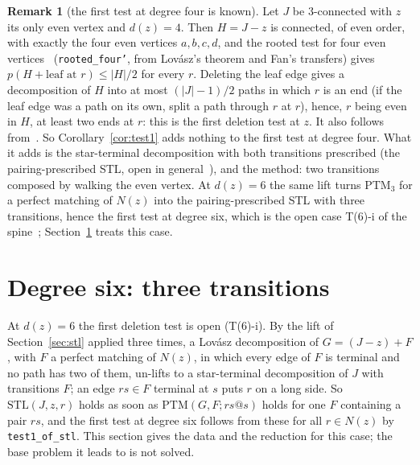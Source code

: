 \documentclass[11pt]{amsart}
\theoremstyle{definition}
\newtheorem{remark}[theorem]{Remark}
\newcommand{\PTM}{\mathrm{PTM}}
\newcommand{\STL}{\mathrm{STL}}
\begin{document}
\begin{remark}[the first test at degree four is known]\label{rem:known}
Let $J$ be $3$-connected with $z$ its only even vertex and $d(z)=4$. Then $H=J-z$ is connected,
of even order, with exactly the four even vertices $a,b,c,d$, and the rooted test for four even
vertices~\cite[Corollary~22]{ES} (\texttt{rooted\_four'}, from Lov\'asz's theorem and Fan's
transfers) gives $p(H+\text{leaf at }r)\le|H|/2$ for every $r$. Deleting the leaf edge gives a
decomposition of $H$ into at most $(|J|-1)/2$ paths in which $r$ is an end (if the leaf edge was a
path on its own, split a path through $r$ at $r$), hence, $r$ being even in $H$, at least two
ends at $r$: this is the first deletion test at $z$. It also follows from~\cite[Theorem~13]{BS}.
So Corollary~\ref{cor:test1} adds nothing to the first test at degree four. What it adds is the
star-terminal decomposition with both transitions prescribed (the pairing-prescribed STL,
open in general~\cite[Conjecture~7.4]{STL}), and the method: two transitions composed by
walking the even vertex. At $d(z)=6$ the same lift turns $\PTM_3$ for a perfect matching of
$N(z)$ into the pairing-prescribed STL with three transitions, hence the first test at degree
six, which is the open case T(6)-i of the spine~\cite{SP}; Section~\ref{sec:six} treats this case.
\end{remark}

\section{Degree six: three transitions}\label{sec:six}

At $d(z)=6$ the first deletion test is open (T(6)-i). By the lift of Section~\ref{sec:stl} applied
three times, a Lov\'asz decomposition of $G=(J-z)+F$, with $F$ a perfect matching of $N(z)$, in
which every edge of $F$ is terminal and no path has two of them, un-lifts to a star-terminal
decomposition of $J$ with transitions $F$; an edge $rs\in F$ terminal at $s$ puts $r$ on a long
side. So $\STL(J,z,r)$ holds as soon as $\PTM(G,F;rs@s)$ holds for one $F$ containing a pair
$rs$, and the first test at degree six follows from these for all $r\in N(z)$ by
\texttt{test1\_of\_stl}. This section gives the data and the reduction for this case; the base
problem it leads to is not solved.
\end{document}
